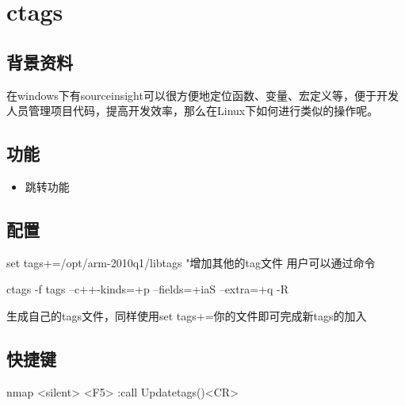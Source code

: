 \chapter{ctags}

\section{背景资料}
在windows下有sourceinsight可以很方便地定位函数、变量、宏定义等，便于开发人员管理项目代码，提高开发效率，那么在Linux下如何进行类似的操作呢。

\section{功能}
\begin{itemize}
    \item 跳转功能
\end{itemize}


\section{配置}
set tags+=/opt/arm-2010q1/libtags "增加其他的tag文件
用户可以通过命令
\begin{code}
ctags -f tags --c++-kinds=+p --fields=+iaS --extra=+q -R
\end{code}
生成自己的tags文件，同样使用set tags+=你的文件即可完成新tags的加入

\section{快捷键}
\begin{code}
nmap <silent> <F5> :call Updatetags()<CR>
\end{code}

\newpage
